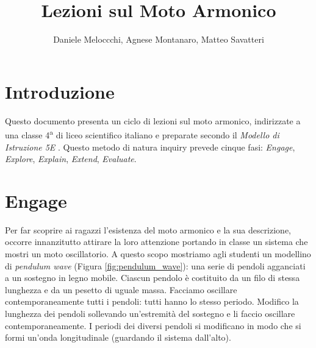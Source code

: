 \documentclass{article}
\title{Lezioni sul Moto Armonico}
\author{Daniele Meloccchi, Agnese Montanaro, Matteo Savatteri}
\begin{document}
\maketitle

\tableofcontents

\section{Introduzione}
Questo documento presenta un ciclo di lezioni sul moto
armonico, indirizzate a una classe 4\textsuperscript{a}
di liceo scientifico italiano e preparate secondo il
\emph{Modello di Istruzione 5E} \cite{bybee2009bscs}.
Questo metodo di natura inquiry prevede cinque fasi:
\emph{Engage}, \emph{Explore},
\emph{Explain}, \emph{Extend}, \emph{Evaluate}.

\section{Engage}
Per far scoprire ai ragazzi l'esistenza del moto armonico e
la sua descrizione, occorre innanzitutto attirare la loro
attenzione portando in classe un sistema che mostri un moto
oscillatorio. A questo scopo mostriamo agli studenti un modellino di
\emph{pendulum wave} (Figura \ref{fig:pendulum_wave}): una
serie di pendoli agganciati a un sostegno in legno mobile.
Ciascun pendolo è costituito da un filo di stessa lunghezza
e da un pesetto di uguale massa. 
Facciamo oscillare contemporaneamente tutti i pendoli:
tutti hanno lo stesso periodo. 
Modifico la lunghezza dei pendoli sollevando un'estremità del
sostegno e li faccio oscillare contemporaneamente. I periodi
dei diversi pendoli si modificano in modo che si formi un'onda
longitudinale (guardando il sistema dall'alto).
\end{document}
